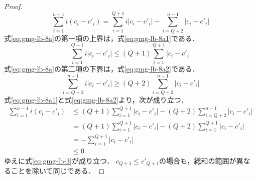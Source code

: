 \begin{proof}
  \begin{equation}
    \label{eq:gmg-lb-8a}
    \sum_{i=1}^{n-1}i(c_i-c'_i)=
    \sum_{i=1}^{Q+1}i|c_i-c'_i|-\sum_{i=Q+2}^{n-1}|c_i-c'_i|
  \end{equation}
  式\eqref{eq:gmg-lb-8a}の第一項の上界は，式\eqref{eq:gmg-lb-8a1}である．
  \begin{equation}
    \label{eq:gmg-lb-8a1}
    \sum_{i=1}^{Q+1}i|c_i-c'_i|\leq (Q+1)\sum_{i=1}^{Q+1}|c_i-c'_i|
  \end{equation}
  式\eqref{eq:gmg-lb-8a}の第二項の下界は，式\eqref{eq:gmg-lb-8a2}である．
  \begin{equation}
    \label{eq:gmg-lb-8a2}
    \sum_{i=Q+2}^{n-1}i|c_i-c'_i|\geq (Q+2)\sum_{i=Q+2}^{n-1}|c_i-c'_i|
  \end{equation}
  式\eqref{eq:gmg-lb-8a1}と式\eqref{eq:gmg-lb-8a2}より，次が成り立つ．
  \begin{align*}
    \sum_{i=1}^{n-1}i(c_i-c'_i)
    &\leq (Q+1)\sum_{i=1}^{Q+1}|c_i-c'_i|-(Q+2)\sum_{i=Q+2}^{n-1}|c_i-c'_i| \\
    &= (Q+1)\sum_{i=1}^{Q+1}|c_i-c'_i|-(Q+2)\sum_{i=1}^{Q+1}|c_i-c'_i| \\
    &= -\sum_{i=1}^{Q+1}|c_i-c'_i| \\
    &\leq 0
  \end{align*}
  ゆえに式\eqref{eq:gmg-lb-3}が成り立つ．
  $c_{Q+1}\leq c'_{Q+1}$の場合も，総和の範囲が異なることを除いて同じである．
\end{proof}

